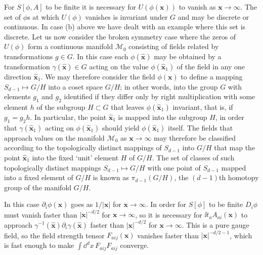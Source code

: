 For $S[\phi,A]$ to be finite it is necessary for $U(\phi(\mathbf{x}))$ to
vanish as $\mathbf{x}\to\infty$. The set of $\phi$s at which $U(\phi)$
vanishes is invariant under $G$ and may be discrete or continuous. In case
(b) above we have dealt with an example where this set is discrete. Let us
now consider the broken symmetry case where the zeros of $U(\phi)$ form a
continuous manifold $\mathcal M_0$ consisting of fields related by
transformations $g\in G$. In this case each $\phi(\hat{\mathbf{x}})$ may be
obtained by a transformation $\gamma(\hat{\mathbf{x}})\in G$ acting on the
value $\phi(\hat{\mathbf{x}}_1)$ of the field in any one direction
$\hat{\mathbf{x}}_1$. We may therefore consider the field $\phi(\mathbf{x})$
to define a mapping $S_{d-1}\mapsto G/H$ into a coset space $G/H$; in other
words, into the group $G$ with elements $g_1$ and $g_2$ identified if they
differ only by right multiplication with some element $h$ of the subgroup
$H\subset G$ that leaves $\phi(\hat{\mathbf{x}}_1)$ invariant, that is, if
$g_1=g_2h$. In particular, the point $\hat{\mathbf{x}}_1$ is mapped into
the subgroup $H$, in order that $\gamma(\hat{\mathbf{x}}_1)$ acting on
$\phi(\hat{\mathbf{x}}_1)$ should yield $\phi(\hat{\mathbf{x}}_1)$ itself.
The fields that approach values on the manifold $\mathcal M_0$ as
$\mathbf{x}\to\infty$ may therefore be classified according to the
topologically distinct mappings of $S_{d-1}$ into $G/H$ that map the point
$\hat{\mathbf{x}}_1$ into the fixed `unit' element $H$ of $G/H$. The set of
classes of such topologically distinct mappings $S_{d-1}\mapsto G/H$ with
one point of $S_{d-1}$ mapped into a fixed element of $G/H$ is known as
$\pi_{d-1}(G/H)$, the $(d-1)$th homotopy group of the manifold $G/H$.

In this case $\partial_i\phi(\mathbf{x})$ goes as $1/|\mathbf{x}|$ for
$\mathbf{x}\to\infty$. In order for $S[\phi]$ to be finite $D_i\phi$ must
vanish faster than $|\mathbf{x}|^{-d/2}$ for $\mathbf{x}\to\infty$, so it
is necessary for $\ii t_a A_{a i}(\mathbf{x})$ to approach
$\gamma^{-1}(\hat{\mathbf{x}})\partial_i\gamma(\hat{\mathbf{x}})$ faster
than $|\mathbf{x}|^{-d/2}$ for $\mathbf{x}\to\infty$. This is a pure gauge
field, so the field strength tensor $F_{a ij}(\mathbf{x})$ vanishes
faster than $|\mathbf{x}|^{-d/2-1}$, which is fast enough to make
$\int \dd^d x\,F_{a ij}F_{a ij}$ converge.

